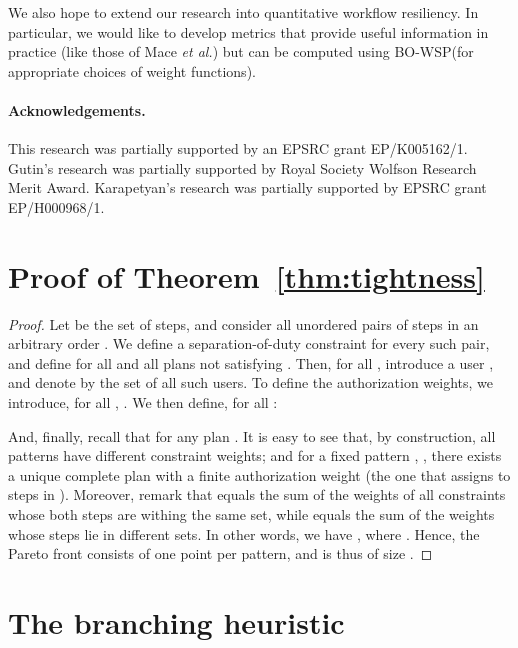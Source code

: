 \documentclass[jcs,crcready]{iosart1c}
\newcommand{\BOWSP}{\textsc{BO-WSP}\xspace}
\begin{document}
We also hope to extend our research into quantitative workflow resiliency.
In particular, we would like to develop metrics that provide useful information in practice (like those of Mace \emph{et al.}) but can be computed using \BOWSP (for appropriate choices of weight functions).

\paragraph{Acknowledgements.}
This research was partially supported by an EPSRC grant EP/K005162/1. 
Gutin's research was partially supported by Royal Society Wolfson Research Merit Award.
Karapetyan's research was partially supported by EPSRC grant EP/H000968/1.




\newpage
\appendix

\section{Proof of Theorem~\ref{thm:tightness}}\label{app:pareto-front-may-have-B-k-points}

\begin{proof}
Let  be the set of  steps, and consider all unordered pairs of steps in an arbitrary order . We define a separation-of-duty constraint for every such pair, and define  for all  and all plans  not satisfying . Then, for all , introduce a user , and denote by  the set of all such users. To define the authorization weights, we introduce, for all , .
We then define, for all :

 And, finally, recall that  for any plan .
It is easy to see that, by construction, all patterns have different constraint weights; and for a fixed pattern , , there exists a unique complete plan  with a finite authorization weight (the one that assigns  to steps in ). Moreover, remark that  equals the sum of the weights of all constraints whose both steps are withing the same set, while  equals the sum of the weights whose steps lie in different sets. In other words, we have , where . Hence, the Pareto front consists of one point per pattern, and is thus of size .
\end{proof}

 
\section{The branching heuristic}\label{sec:bh}
\end{document}
